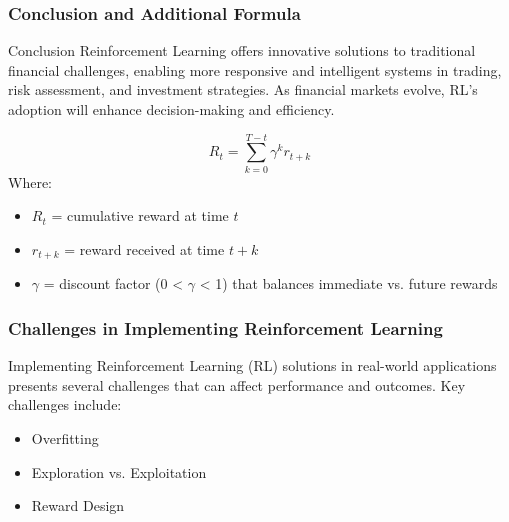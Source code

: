 \documentclass[aspectratio=169]{beamer}
\begin{document}
\begin{frame}[fragile]
    \frametitle{Conclusion and Additional Formula}
    \begin{block}{Conclusion}
        Reinforcement Learning offers innovative solutions to traditional financial challenges, enabling more responsive and intelligent systems in trading, risk assessment, and investment strategies. As financial markets evolve, RL's adoption will enhance decision-making and efficiency.
    \end{block}
    
    \begin{equation}
        R_t = \sum_{k=0}^{T-t} \gamma^k r_{t+k}
    \end{equation}
    Where:
    \begin{itemize}
        \item \( R_t \) = cumulative reward at time \( t \)
        \item \( r_{t+k} \) = reward received at time \( t+k \)
        \item \( \gamma \) = discount factor (0 < \( \gamma \) < 1) that balances immediate vs. future rewards
    \end{itemize}
\end{frame}

\begin{frame}[fragile]
    \frametitle{Challenges in Implementing Reinforcement Learning}
    Implementing Reinforcement Learning (RL) solutions in real-world applications presents several challenges that can affect performance and outcomes. Key challenges include:
    \begin{itemize}
        \item Overfitting
        \item Exploration vs. Exploitation
        \item Reward Design
    \end{itemize}
\end{frame}
\end{document}
